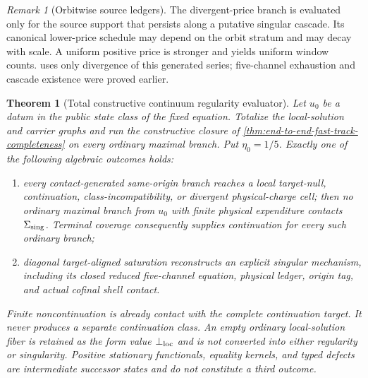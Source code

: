 \documentclass[11pt]{article}
\numberwithin{section}{part}
\theoremstyle{plain}
\newtheorem{theorem}{Theorem}[section]
\theoremstyle{definition}
\theoremstyle{remark}
\newtheorem{remark}[remark]{Remark}
\begin{document}
\begin{remark}[Orbitwise source ledgers]
The divergent-price branch is evaluated only for the source support that
persists along a putative singular cascade.  Its canonical lower-price
schedule may depend on the orbit stratum and may decay with scale.  A uniform
positive price is stronger and yields uniform window counts.
 uses only divergence of this
generated series; five-channel exhaustion and cascade existence were proved
earlier.
\end{remark}

\begin{theorem}[Total constructive continuum regularity evaluator]
\label{thm:total-continuum-regularity-alternative}
Let \(u_0\) be a datum in the public state class of the fixed equation.
Totalize the local-solution and carrier graphs and run the constructive closure
of \cref{thm:end-to-end-fast-track-completeness} on every ordinary maximal
branch.  Put \(\eta_0=1/5\).  Exactly one of the following algebraic outcomes
holds:
\begin{enumerate}[label=\textup{(\roman*)}]
\item every contact-generated same-origin branch reaches a local
target-null, continuation, class-incompatibility, or divergent
physical-charge cell; then no ordinary maximal branch from \(u_0\) with
finite physical expenditure contacts \(\Sigma_{\rm sing}\).  Terminal
coverage consequently supplies continuation for every such ordinary branch;
\item diagonal target-aligned saturation reconstructs an explicit singular
mechanism, including its closed reduced five-channel equation, physical
ledger, origin tag, and actual cofinal shell contact.
\end{enumerate}
Finite noncontinuation is already contact with the complete continuation
target.  It never produces a separate continuation class.  An empty ordinary
local-solution fiber is retained as the form value \(\bot_{\rm loc}\) and is
not converted into either regularity or singularity.  Positive stationary
functionals, equality kernels, and typed defects are intermediate successor
states and do not constitute a third outcome.
\end{theorem}
\end{document}
